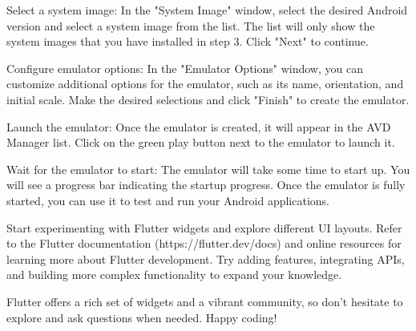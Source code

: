 Select a system image: In the "System Image" window, select the desired Android version and select a system image 
from the list. The list will only show the system images that you have installed in step 3. Click "Next" to continue.

Configure emulator options: In the "Emulator Options" window, you can customize additional options for the 
emulator, such as its name, orientation, and initial scale. Make the desired selections and click "Finish" 
to create the emulator.

Launch the emulator: Once the emulator is created, it will appear in the AVD Manager list. Click on the green 
play button next to the emulator to launch it.

Wait for the emulator to start: The emulator will take some time to start up. You will see a progress bar 
indicating the startup progress. Once the emulator is fully started, you can use it to test and run your 
Android applications.

Start experimenting with Flutter widgets and explore different UI layouts.
Refer to the Flutter documentation (https://flutter.dev/docs) and online resources for learning more about Flutter 
development. Try adding features, integrating APIs, and building more complex functionality to expand your knowledge.

Flutter offers a rich set of widgets and a vibrant community, so don't hesitate to explore and ask questions when 
needed. Happy coding!